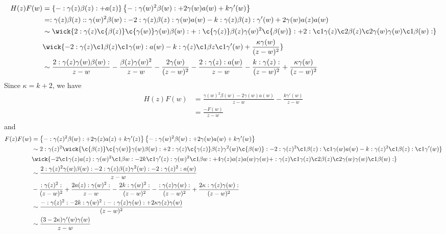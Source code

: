 \begin{equation}
	\begin{split}
	H(z)F(w) & = \left\{-:\gamma(z)\beta(z): + a(z) \right\} \left\{-: \gamma(w)^2 \beta(w): + 2\gamma(w)a(w) +k \gamma'(w) \right\}\\
	& = : \gamma(z)\beta(z)::\gamma(w)^2\beta(w): -2 : \gamma(z)\beta(z):\gamma(w)a(w) - k:\gamma(z)\beta(z): \gamma'(w) + 2\gamma(w) a(z)a(w)\\
	& \sim \wick{2:\gamma(z) \c{\beta(z)}\c{\gamma(w)} \gamma(w)\beta(w): + : \c{\gamma(z)} \beta(z)\gamma(w)^2 \c{\beta(w)}: + 2 : \c1{\gamma(z)} \c2{\beta(z)}\c2{\gamma(w)} \gamma(w) \c1{\beta(w)}:}\\
	&  \wick{- 2: \gamma(z)\c1{\beta(z)} \c1{\gamma(w)}: a(w) - k : \gamma(z)\c1{\beta{z}} \c1{\gamma'(w)} + \frac{\kappa\gamma(w)}{(z-w)^2} }\\
	& \sim \frac{2: \gamma(z)\gamma(w)\beta(w):}{z-w} - \frac{\beta(z) \gamma(w)^2}{z-w} - \frac{2\gamma(w)}{(z-w)^2} - \frac{2: \gamma(z): a(w)}{z-w} - \frac{k: \gamma(z):}{(z-w)^2} + \frac{\kappa \gamma(w)}{(z-w)^2} \\
	\end{split}
\end{equation}
Since $\kappa = k+2$, we have 
\begin{equation}
	\begin{split}
	H(z)F(w) & = \frac{\gamma(w)^2\beta(w) - 2 \gamma(w)a(w)}{z-w} - \frac{k\gamma'(w)}{z-w}\\
	& = \frac{- F(w)}{z-w}\\
	\end{split}
\end{equation}
and 
\begin{equation}
	\begin{split}
	F(z)F(w) &= \left\{- : \gamma(z)^2\beta(w): + 2 \gamma(z)a(z) + k\gamma'(z) \right\} \left\{-:\gamma(w)^2\beta(w): + 2\gamma(w)a(w) + k\gamma'(w) \right\}\\
	& \sim 2: \gamma(z)^2 \wick{\c{\beta(z)} \c{\gamma(w)} \gamma(w)\beta(w): + 2 : \gamma(z)\c{\gamma(z)} \beta(z)\gamma^2(w) \c{\beta(w)}: -2: \gamma(z)^2 \c1{\beta(z)}: \c1{\gamma(w)} a(w) - k : \gamma(z)^2 \c1{\beta(z)} : \c1{\gamma'(w)}}\\
	&\wick{ - 2 \c1{\gamma(z)} a(z): \gamma(w)^2 \c1{\beta{w}}: -2 k \c1{\gamma'(z)}: \gamma(w)^2 \c1{\beta{w}}: + 4 \gamma(z)a(z)a(w)\gamma(w) + : \gamma(z)\c1{\gamma(z)} \c2{\beta(z)} \c2{\gamma(w)} \gamma(w) \c1{\beta(w)}: }\\
	& \sim \frac{2:\gamma(z)^2 \gamma(w) \beta(w):- 2: \gamma(z)\beta(z) \gamma^2(w): - 2: \gamma(z)^2: a(w)}{z-w}\\
	& - \frac{: \gamma(z)^2:}{(z-w)^2} + \frac{2a(z): \gamma(w)^2:}{z-w} - \frac{2k: \gamma(w)^2:}{(z-w)^2} - \frac{:\gamma(z)\gamma(w):}{(z-w)^2} + \frac{2\kappa:\gamma(z)\gamma(w):}{(z-w)^2}\\
	& \sim \frac{- : \gamma(z)^2: - 2k:\gamma(w)^2: - :\gamma(z)\gamma(w): + 2\kappa\gamma(z)\gamma(w)}{(z-w)^2}\\
	& \sim \frac{(3 - 2\kappa)\gamma'(w)\gamma(w)}{z-w}
	\end{split}
\end{equation}
